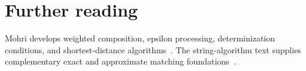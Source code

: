\section{Further reading}
\label{sec:ch79-reading}
Mohri develops weighted composition, epsilon processing, determinization conditions, and shortest-distance algorithms~\cite{mohri-2009-weighted}.
The string-algorithm text supplies complementary exact and approximate matching foundations~\cite{crochemore-2007-strings}.
